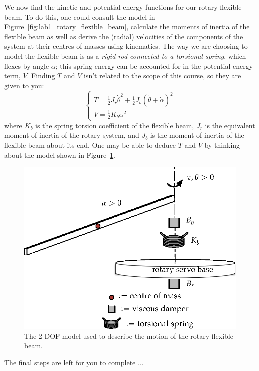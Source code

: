 \documentclass[12pt]{report}
\begin{document}
We now find the kinetic and potential energy functions for our rotary flexible beam. To do this, one could consult the model in Figure~\ref{fig:lab1_rotary_flexible_beam}, calculate the moments of inertia of the flexible beam as well as derive the (radial) velocities of the components of the system at their centres of masses using kinematics. The way we are choosing to model the flexible beam is as a \emph{rigid rod connected to a torsional spring}, which flexes by angle $\alpha$; this spring energy can be accounted for in the potential energy term, $V$. Finding $T$ and $V$ isn't related to the scope of this course, so they are given to you:
\begin{equation*}
    \begin{cases}
        T = \frac{1}{2}J_r \dot{\theta}^2 + \frac{1}{2} J_b \left(\dot{\theta}+\dot{\alpha}\right)^2 \\
        V = \frac{1}{2} K_b \alpha^2
    \end{cases}
\end{equation*}
where $K_b$ is the spring torsion coefficient of the flexible beam, $J_r$ is the equivalent moment of inertia of the rotary system, and $J_b$ is the moment of inertia of the flexible beam about its end. One may be able to deduce $T$ and $V$ by thinking about the model shown in Figure~\ref{fig:lab1_rotary_flexible_beam_breakdown}.
\begin{figure}[htb!]
    \centering
    \includegraphics[width=.6\linewidth]{eps/lab_1/rotary_flexible_beam_breakdown_edit.eps}
    \caption{The 2-DOF model used to describe the motion of the rotary flexible beam.}
    \label{fig:lab1_rotary_flexible_beam_breakdown}
\end{figure}
The final steps are left for you to complete $\dots$
\end{document}
